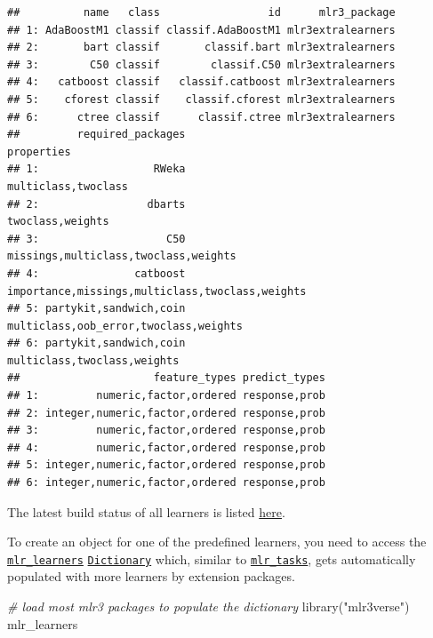\documentclass[
]{scrbook}
\newenvironment{Shaded}{\begin{snugshade}}{\end{snugshade}}
\newcommand{\CommentTok}[1]{\textcolor[rgb]{0.56,0.35,0.01}{\textit{#1}}}
\newcommand{\FunctionTok}[1]{\textcolor[rgb]{0.00,0.00,0.00}{#1}}
\newcommand{\NormalTok}[1]{#1}
\newcommand{\StringTok}[1]{\textcolor[rgb]{0.31,0.60,0.02}{#1}}
\renewenvironment{Shaded} {\begin{snugshade}\small} {\end{snugshade}}
\begin{document}
\begin{verbatim}
##          name   class                 id      mlr3_package
## 1: AdaBoostM1 classif classif.AdaBoostM1 mlr3extralearners
## 2:       bart classif       classif.bart mlr3extralearners
## 3:        C50 classif        classif.C50 mlr3extralearners
## 4:   catboost classif   classif.catboost mlr3extralearners
## 5:    cforest classif    classif.cforest mlr3extralearners
## 6:      ctree classif      classif.ctree mlr3extralearners
##         required_packages                                      properties
## 1:                  RWeka                             multiclass,twoclass
## 2:                 dbarts                                twoclass,weights
## 3:                    C50            missings,multiclass,twoclass,weights
## 4:               catboost importance,missings,multiclass,twoclass,weights
## 5: partykit,sandwich,coin           multiclass,oob_error,twoclass,weights
## 6: partykit,sandwich,coin                     multiclass,twoclass,weights
##                     feature_types predict_types
## 1:         numeric,factor,ordered response,prob
## 2: integer,numeric,factor,ordered response,prob
## 3:         numeric,factor,ordered response,prob
## 4:         numeric,factor,ordered response,prob
## 5: integer,numeric,factor,ordered response,prob
## 6: integer,numeric,factor,ordered response,prob
\end{verbatim}

The latest build status of all learners is listed \href{https://mlr3extralearners.mlr-org.com/articles/learners/learner_status.html}{here}.

To create an object for one of the predefined learners, you need to access the \href{https://mlr3.mlr-org.com/reference/mlr_learners.html}{\texttt{mlr\_learners}} \href{https://mlr3misc.mlr-org.com/reference/Dictionary.html}{\texttt{Dictionary}} which, similar to \href{https://mlr3.mlr-org.com/reference/mlr_tasks.html}{\texttt{mlr\_tasks}}, gets automatically populated with more learners by extension packages.

\begin{Shaded}
\begin{Highlighting}[]
\CommentTok{\# load most mlr3 packages to populate the dictionary}
\FunctionTok{library}\NormalTok{(}\StringTok{"mlr3verse"}\NormalTok{)}
\NormalTok{mlr\_learners}
\end{Highlighting}
\end{Shaded}
\end{document}

